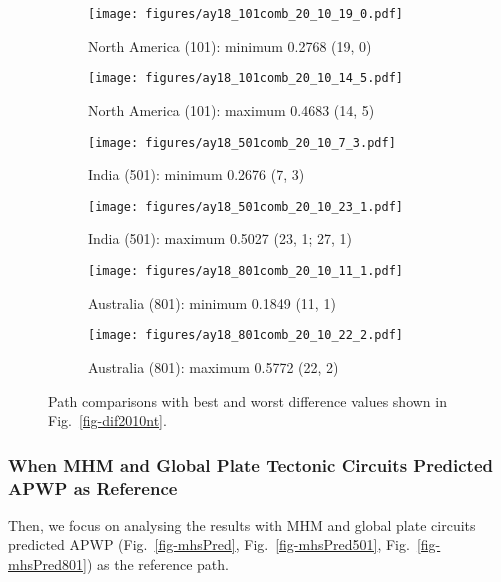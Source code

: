 \begin{figure*}
	\centering
	\begin{subfigure}{.43\textwidth}
		\texttt{[image: figures/ay18\_101comb\_20\_10\_19\_0.pdf]}
		\caption{North America (101): minimum 0.2768 (19, 0)}\label{fig-nant-2010190}
	\end{subfigure}
	\begin{subfigure}{.43\textwidth}
		\texttt{[image: figures/ay18\_101comb\_20\_10\_14\_5.pdf]}
		\caption{North America (101): maximum 0.4683 (14, 5)}\label{fig-nant-2010145}
	\end{subfigure}
	\vspace{.1em}
	\begin{subfigure}{.43\textwidth}
		\texttt{[image: figures/ay18\_501comb\_20\_10\_7\_3.pdf]}
		\caption{India (501): minimum 0.2676 (7, 3)}\label{fig-indnt-201073}
	\end{subfigure}
	\begin{subfigure}{.43\textwidth}
		\texttt{[image: figures/ay18\_501comb\_20\_10\_23\_1.pdf]}
		\caption{India (501): maximum 0.5027 (23, 1; 27, 1)}\label{fig-indnt-2010231}
	\end{subfigure}
	\vspace{.1em}
	\begin{subfigure}{.43\textwidth}
		\texttt{[image: figures/ay18\_801comb\_20\_10\_11\_1.pdf]}
		\caption{Australia (801): minimum 0.1849 (11, 1)}\label{fig-aunt-2010111}
	\end{subfigure}
	\begin{subfigure}{.43\textwidth}
		\texttt{[image: figures/ay18\_801comb\_20\_10\_22\_2.pdf]}
		\caption{Australia (801): maximum 0.5772 (22, 2)}\label{fig-aunt-2010222}
	\end{subfigure}
	\caption[Best and worst differences without shape test (20 Myr bin, 10 Myr
step)]{Path comparisons with best and worst difference values shown in
Fig.~\ref{fig-dif2010nt}.}\label{fig-dif2010ntbw}
\end{figure*}

\subsubsection{When MHM and Global Plate Tectonic Circuits Predicted APWP as
Reference}

Then, we focus on analysing the results with MHM and global plate circuits
predicted APWP (Fig.~\ref{fig-mhsPred}, Fig.~\ref{fig-mhsPred501},
Fig.~\ref{fig-mhsPred801}) as the reference path.

